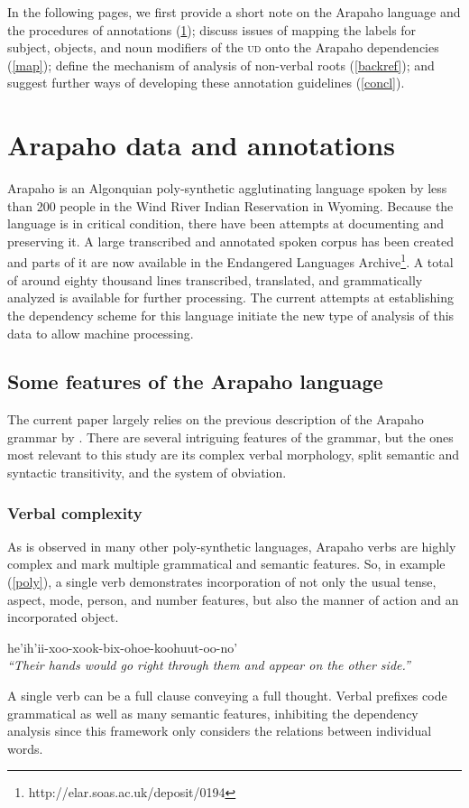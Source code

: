 \documentclass[11pt]{article}
\begin{document}
    In the following pages, we first provide a short note on the Arapaho language and the procedures of annotations (\ref{arapaho}); discuss issues of mapping the labels for subject, objects, and noun modifiers of the \textsc{ud} onto the Arapaho dependencies (\ref{map}); define the mechanism of analysis of non-verbal roots (\ref{backref}); and suggest further ways of developing these annotation guidelines (\ref{concl}).
\section{Arapaho data and annotations} \label{arapaho}
Arapaho is an Algonquian poly-synthetic agglutinating language spoken by less than 200 people in the Wind River Indian Reservation in Wyoming. Because the language is in critical condition, there have been attempts at documenting and preserving it. A large transcribed and annotated spoken corpus has been created and parts of it are now available in the Endangered Languages Archive\footnote{http://elar.soas.ac.uk/deposit/0194}. A total of around eighty thousand lines transcribed, translated, and grammatically analyzed is available for further processing. The current attempts at establishing the dependency scheme for this language initiate the new type of analysis of this data to allow machine processing. 
\subsection{Some features of the Arapaho language}
The current paper largely relies on the previous description of the Arapaho grammar by . There are several intriguing features of the grammar, but the ones most relevant to this study are its complex verbal morphology, split semantic and syntactic transitivity, and the system of obviation. 
\subsubsection{Verbal complexity}
As is observed in many other poly-synthetic languages, Arapaho verbs are highly complex and mark multiple grammatical and semantic features. So, in example (\ref{poly}), a single verb demonstrates incorporation of not only the usual tense, aspect, mode, person, and number features, but also the manner of action and an incorporated object. 

\small
\begin{exe}
\ex \label{poly}
he'ih'ii-xoo-xook-bix-ohoe-koohuut-oo-no'\\
\textit{``Their hands would go right through them and appear on the other side.''}
\end{exe}
\normalsize
A single verb can be a full clause conveying a full thought. Verbal prefixes code grammatical as well as many semantic features, inhibiting the dependency analysis since this framework only considers the relations between individual words.
\end{document}
